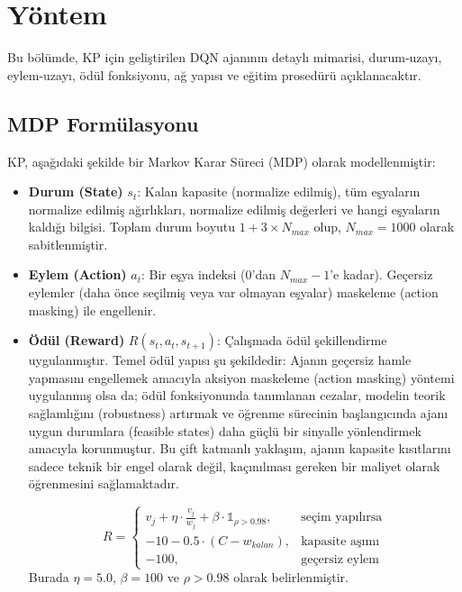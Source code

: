 \documentclass[conference]{IEEEtran}
\begin{document}
\section{Yöntem}
\label{sec:yontem}
Bu bölümde, KP için geliştirilen DQN ajanının detaylı mimarisi, durum-uzayı, eylem-uzayı, ödül fonksiyonu, ağ yapısı ve eğitim prosedürü açıklanacaktır.

\subsection{MDP Formülasyonu}
KP, aşağıdaki şekilde bir Markov Karar Süreci (MDP) olarak modellenmiştir:

\begin{itemize}
    \item \textbf{Durum (State)} $s_t$: Kalan kapasite (normalize edilmiş), tüm eşyaların normalize edilmiş ağırlıkları, normalize edilmiş değerleri ve hangi eşyaların kaldığı bilgisi. Toplam durum boyutu $1 + 3 \times N_{max}$ olup, $N_{max}=1000$ olarak sabitlenmiştir.
    
    \item \textbf{Eylem (Action)} $a_t$: Bir eşya indeksi (0'dan $N_{max}-1$'e kadar). Geçersiz eylemler (daha önce seçilmiş veya var olmayan eşyalar) maskeleme (action masking) ile engellenir.
    
    \item \textbf{Ödül (Reward)} $R(s_t, a_t, s_{t+1})$: Çalışmada ödül şekillendirme uygulanmıştır. Temel ödül yapısı şu şekildedir: Ajanın geçersiz hamle yapmasını engellemek amacıyla aksiyon maskeleme (action masking) yöntemi uygulanmış olsa da; ödül fonksiyonunda tanımlanan cezalar, modelin teorik sağlamlığını (robustness) artırmak ve öğrenme sürecinin başlangıcında ajanı uygun durumlara (feasible states) daha güçlü bir sinyalle yönlendirmek amacıyla korunmuştur. Bu çift katmanlı yaklaşım, ajanın kapasite kısıtlarını sadece teknik bir engel olarak değil, kaçınılması gereken bir maliyet olarak öğrenmesini sağlamaktadır.

\[
R = 
\begin{cases}
    v_j + \eta \cdot \frac{v_j}{w_j} + \beta \cdot \mathds{1}_{\rho > 0.98}, & \text{seçim yapılırsa} \\
    -10 - 0.5 \cdot (C - w_{kalan}), & \text{kapasite aşımı} \\
    -100, & \text{geçersiz eylem}
\end{cases}
\]
Burada $\eta = 5.0$, $\beta = 100$ ve $\rho > 0.98$ olarak belirlenmiştir.
\end{itemize}
\end{document}
